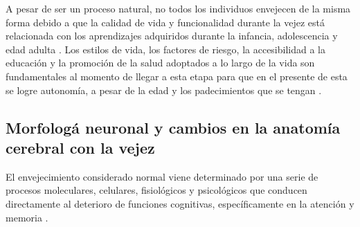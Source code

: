 A pesar de ser un proceso natural, no todos los individuos envejecen de la misma forma debido a 
que la calidad de vida y funcionalidad durante la vejez est\'a relacionada con los aprendizajes 
adquiridos durante la infancia, adolescencia y edad adulta \cite{Ohayon04}. 
Los estilos de vida, los factores de riesgo, la accesibilidad a la educaci\'on y la promoci\'on 
de la salud adoptados a lo largo de la vida son fundamentales al momento de llegar a esta etapa 
para que en el presente de esta se logre autonom\'ia, a pesar de la edad y los padecimientos que 
se tengan \cite{Sanhueza14}.



\subsection{Morfolog\'a neuronal y cambios en la anatomía cerebral con la vejez}

El envejecimiento considerado normal viene determinado por una serie de procesos moleculares, 
celulares, fisiol\'ogicos y psicol\'ogicos que conducen directamente al deterioro de funciones 
cognitivas, específicamente en la atenci\'on y memoria \cite{Navarrete03,Park09}.

